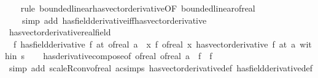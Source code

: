 \begin{isabellebody}
%
\isadelimproof
\ \ %
\endisadelimproof
%
\isatagproof
{}\isamarkupfalse%
\ {\isacharparenleft}{\kern0pt}rule\ bounded{\isacharunderscore}{\kern0pt}linear{\isachardot}{\kern0pt}has{\isacharunderscore}{\kern0pt}vector{\isacharunderscore}{\kern0pt}derivative{\isacharbrackleft}{\kern0pt}OF\ bounded{\isacharunderscore}{\kern0pt}linear{\isacharunderscore}{\kern0pt}of{\isacharunderscore}{\kern0pt}real{\isacharbrackright}{\kern0pt}{\isacharparenright}{\kern0pt}\isanewline
\ \ \ \ {\isacharparenleft}{\kern0pt}simp\ add{\isacharcolon}{\kern0pt}\ has{\isacharunderscore}{\kern0pt}field{\isacharunderscore}{\kern0pt}derivative{\isacharunderscore}{\kern0pt}iff{\isacharunderscore}{\kern0pt}has{\isacharunderscore}{\kern0pt}vector{\isacharunderscore}{\kern0pt}derivative{\isacharparenright}{\kern0pt}%
\endisatagproof
{\isafoldproof}%
%
\isadelimproof
\isanewline
%
\endisadelimproof
\isanewline
{}\isamarkupfalse%
\ has{\isacharunderscore}{\kern0pt}vector{\isacharunderscore}{\kern0pt}derivative{\isacharunderscore}{\kern0pt}real{\isacharunderscore}{\kern0pt}field{\isacharcolon}{\kern0pt}\isanewline
\ \ {\isachardoublequoteopen}{\isacharparenleft}{\kern0pt}f\ has{\isacharunderscore}{\kern0pt}field{\isacharunderscore}{\kern0pt}derivative\ f{\isacharprime}{\kern0pt}{\isacharparenright}{\kern0pt}\ {\isacharparenleft}{\kern0pt}at\ {\isacharparenleft}{\kern0pt}of{\isacharunderscore}{\kern0pt}real\ a{\isacharparenright}{\kern0pt}{\isacharparenright}{\kern0pt}\ {\isasymLongrightarrow}\ {\isacharparenleft}{\kern0pt}{\isacharparenleft}{\kern0pt}{\isasymlambda}x{\isachardot}{\kern0pt}\ f\ {\isacharparenleft}{\kern0pt}of{\isacharunderscore}{\kern0pt}real\ x{\isacharparenright}{\kern0pt}{\isacharparenright}{\kern0pt}\ has{\isacharunderscore}{\kern0pt}vector{\isacharunderscore}{\kern0pt}derivative\ f{\isacharprime}{\kern0pt}{\isacharparenright}{\kern0pt}\ {\isacharparenleft}{\kern0pt}at\ a\ within\ s{\isacharparenright}{\kern0pt}{\isachardoublequoteclose}\isanewline
%
\isadelimproof
\ \ %
\endisadelimproof
%
\isatagproof
{}\isamarkupfalse%
\ has{\isacharunderscore}{\kern0pt}derivative{\isacharunderscore}{\kern0pt}compose{\isacharbrackleft}{\kern0pt}of\ of{\isacharunderscore}{\kern0pt}real\ of{\isacharunderscore}{\kern0pt}real\ a\ {\isacharunderscore}{\kern0pt}\ f\ {\isachardoublequoteopen}{\isacharparenleft}{\kern0pt}{\isacharasterisk}{\kern0pt}{\isacharparenright}{\kern0pt}\ f{\isacharprime}{\kern0pt}{\isachardoublequoteclose}{\isacharbrackright}{\kern0pt}\ \isanewline
\ \ \isamarkupfalse%
\ {\isacharparenleft}{\kern0pt}simp\ add{\isacharcolon}{\kern0pt}\ scaleR{\isacharunderscore}{\kern0pt}conv{\isacharunderscore}{\kern0pt}of{\isacharunderscore}{\kern0pt}real\ ac{\isacharunderscore}{\kern0pt}simps\ has{\isacharunderscore}{\kern0pt}vector{\isacharunderscore}{\kern0pt}derivative{\isacharunderscore}{\kern0pt}def\ has{\isacharunderscore}{\kern0pt}field{\isacharunderscore}{\kern0pt}derivative{\isacharunderscore}{\kern0pt}def{\isacharparenright}{\kern0pt}%

\end{isabellebody}
